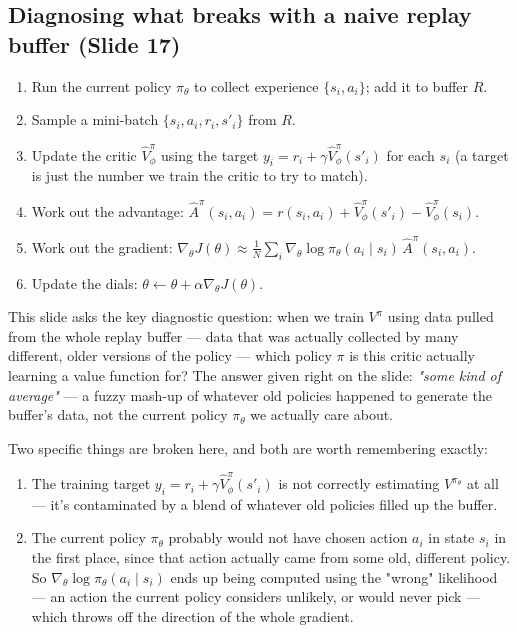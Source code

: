 \documentclass[11pt]{article}
\begin{document}
\subsection{Diagnosing what breaks with a naive replay buffer (Slide 17)}
\begin{enumerate}[leftmargin=*]
  \item Run the current policy $\pi_\theta$ to collect experience $\{s_i,a_i\}$; add it to buffer $R$.
  \item Sample a mini-batch $\{s_i,a_i,r_i,s'_i\}$ from $R$.
  \item Update the critic $\hat V^\pi_\phi$ using the target $y_i = r_i + \gamma \hat V^\pi_\phi(s'_i)$ for each $s_i$ (a target is just the number we train the critic to try to match).
  \item Work out the advantage: $\hat A^\pi(s_i,a_i) = r(s_i,a_i) + \hat V^\pi_\phi(s'_i) - \hat V^\pi_\phi(s_i)$.
  \item Work out the gradient: $\nabla_\theta J(\theta) \approx \frac{1}{N}\sum_i \nabla_\theta\log\pi_\theta(a_i\mid s_i)\,\hat A^\pi(s_i,a_i)$.
  \item Update the dials: $\theta \leftarrow \theta + \alpha\nabla_\theta J(\theta)$.
\end{enumerate}
This slide asks the key diagnostic question: when we train $V^\pi$ using data pulled from the whole replay buffer --- data that was actually collected by many different, older versions of the policy --- which policy $\pi$ is this critic actually learning a value function for? The answer given right on the slide: \emph{"some kind of average"} --- a fuzzy mash-up of whatever old policies happened to generate the buffer's data, not the current policy $\pi_\theta$ we actually care about.

Two specific things are broken here, and both are worth remembering exactly:
\begin{enumerate}[leftmargin=*]
  \item The training target $y_i = r_i + \gamma \hat V^\pi_\phi(s'_i)$ is not correctly estimating $V^{\pi_\theta}$ at all --- it's contaminated by a blend of whatever old policies filled up the buffer.
  \item The current policy $\pi_\theta$ probably would not have chosen action $a_i$ in state $s_i$ in the first place, since that action actually came from some old, different policy. So $\nabla_\theta\log\pi_\theta(a_i\mid s_i)$ ends up being computed using the "wrong" likelihood --- an action the current policy considers unlikely, or would never pick --- which throws off the direction of the whole gradient.
\end{enumerate}
\end{document}
